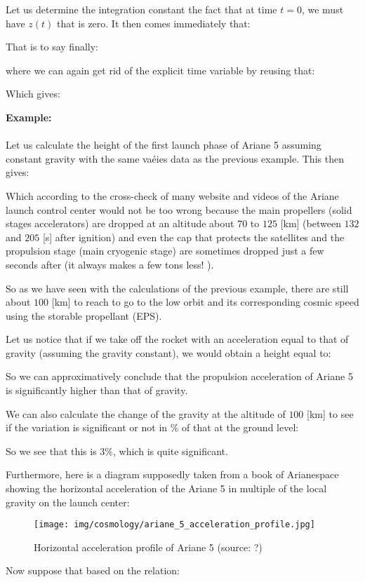 	
	Let us determine the integration constant the fact that at time $t = 0$, we must have $z (t)$ that is zero. It then comes immediately that:
	
	That is to say finally:
	
	where we can again get rid of the explicit time variable by reusing that:
	
	Which gives:
	
	\begin{tcolorbox}[colframe=black,colback=white,sharp corners]
	\textbf{{\Large {}}Example:}\\\\
	Let us calculate the height of the first launch phase of Ariane 5 assuming constant gravity with the same vaéies data as the previous example. This then gives:
	
	Which according to the cross-check of many website and videos of the Ariane  launch control center would not be too wrong because the main propellers (solid stages accelerators) are dropped at an altitude about $70$ to $125$ [km] (between $132$ and $205$ [s] after ignition) and even the cap that protects the satellites and the propulsion stage (main cryogenic stage) are sometimes dropped just a few seconds after (it always makes a few tons less! ).
	\end{tcolorbox}
	So as we have seen with the calculations of the previous example, there are still about $100$ [km] to reach to go to the low orbit and its corresponding cosmic speed using the storable propellant (EPS).
	
	Let us notice that if we take off the rocket with an acceleration equal to that of gravity (assuming the gravity constant), we would obtain a height equal to:
	
	So we can approximatively conclude that the propulsion acceleration of Ariane 5 is significantly higher than that of gravity.
	
	We can also calculate the change of the gravity at the altitude of $100$ [km] to see if the variation is significant or not in $\%$ of that at the ground level:
	
	So we see that this is $3\%$, which is quite significant.
	
	Furthermore, here is a diagram supposedly taken from a book of Arianespace showing the horizontal acceleration of the Ariane 5 in multiple of the local gravity on the launch center:
	\begin{figure}[H]
		\centering
		\texttt{[image: img/cosmology/ariane\_5\_acceleration\_profile.jpg]}
		\caption{Horizontal acceleration profile of Ariane 5 (source: ?)}
	\end{figure}
	Now suppose that based on the relation:
	
